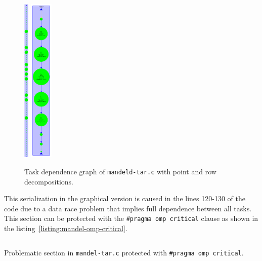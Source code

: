 \begin{figure}[H]
\centering
\includegraphics[height=8cm]{plots/dependency_graph_mandeld_point.png}
\hspace{5em}
\includegraphics[height=8cm]{plots/dependency_graph_mandeld_row.pdf}
\caption{Task dependence graph of \texttt{mandeld-tar.c} with point and row decompositions.}
\label{graph:mandeld_point_and_row}
\end{figure}

This serialization in the graphical version is caused in the lines 120-130 of the code due to a data race problem that implies full dependence between all tasks. This section can be protected with the \texttt{\#pragma omp critical} clause as shown in the listing~\ref{listing:mandel-omp-critical}.

\begin{listing}[H]
\inputminted[firstline=120,lastline=130]{c}{sources/mandel-omp-v1.c}
\caption{Problematic section in \texttt{mandel-tar.c} protected with \texttt{\#pragma omp critical}.}
\label{listing:mandel-omp-critical}
\end{listing}

